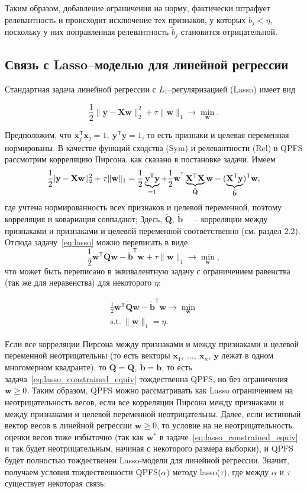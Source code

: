\documentclass[12pt, twoside]{article}
\newcommand{\bx}{\mathbf{x}}
\newcommand{\by}{\mathbf{y}}
\newcommand{\bw}{\mathbf{w}}
\newcommand{\bb}{\mathbf{b}}
\newcommand{\bX}{\mathbf{X}}
\newcommand{\bQ}{\mathbf{Q}}
\newcommand{\getT}{^{\mathsf{T}}}
\begin{document}
Таким образом, добавление ограничения на норму, фактически штрафует релевантность и происходит исключение тех признаков, у которых $b_j < \eta$, поскольку у них поправленная релевантность $\tilde{b}_j$ становится отрицательной.

\subsection{Связь с Lasso--моделью для линейной регрессии}

Стандартная задача линейной регрессии с $L_1$--регуляризацией (Lasso) имеет вид

\begin{equation}
\label{eq:lasso}
\frac{1}{2}\|\by - \bX \bw\|_2^2 + \tau \|\bw\|_1 \to \min_{\bw}.
\end{equation}

Предположим, что $\bx_j\getT\bx_j = 1, \:\by\getT \by = 1$, то есть признаки и целевая переменная нормированы. В качестве функций сходства (Sym) и релевантности (Rel) в QPFS рассмотрим корреляцию Пирсона, как сказано в постановке задачи. Имеем
$$
\frac{1}{2}|\by - \bX \bw\|_2^2 + \tau \|\bw\|_1 = \frac{1}{2} \underbrace{\by\getT \by}_{=1} + \frac{1}{2} \bw^{\T} \underbrace{\bX\getT \bX}_{\tilde{\bQ}} \bw - (\underbrace{\bX\getT \by}_{\tilde{\bb}})\getT \bw,
$$
где учтена нормированность всех признаков и целевой переменной, поэтому корреляция и ковариация совпадают; Здесь, $\tilde{\bQ},\:\tilde{\bb}$ ~~-- корреляции между признаками и признаками и целевой переменной соответственно (см. раздел 2.2). Отсюда задачу~\eqref{eq:lasso} можно переписать в виде
$$
\frac{1}{2} \bw\getT \tilde{\bQ} \bw - \tilde{\bb}\getT\bw + \tau \|\bw\|_1 \to \min_{\bw},
$$
что может быть переписано в эквивалентную задачу с ограничением равенства (так же для неравенства) для некоторого $\eta$:

\begin{equation}
\begin{gathered}
\label{eq:lasso_constrained_equiv}
\frac{1}{2} \bw\getT \tilde{\bQ} \bw - \tilde{\bb}\getT \bw \to \min_{\bw}\\
\text{s.t.}\:\|\bw\|_1 = \eta.
\end{gathered}
\end{equation}


Если все корреляции Пирсона между признаками и между признаками и целевой переменной неотрицательны (то есть векторы $\bx_1,\:\ldots,\:\bx_n,\:\by$ лежат в одном многомерном квадранте), то $\tilde{\bQ} = \bQ,\:\tilde{\bb} = \bb$, то есть задача~\eqref{eq:lasso_constrained_equiv} тождественна QPFS, но без ограничения $\bw \geq 0$. Таким образом, QPFS можно рассматривать как Lasso ограничением на неотрицательность весов, если все корреляции Пирсона между признаками и между признаками и целевой переменной неотрицательны. Далее, если истинный вектор весов в линейной регрессии $\bw \geq 0$, то условие на не неотрицательность оценки весов тоже избыточно (так как $\bw^*$ в задаче~\eqref{eq:lasso_constrained_equiv} и так будет неотрицательным, начиная с некоторого размера выборки), и QPFS будет полностью тождественен Lasso-модели для линейной регрессии. Значит, получаем условия тождественности QPFS($\alpha$) методу lasso($\tau$), где между $\alpha$ и $\tau$ существует некоторая связь:
\end{document}
